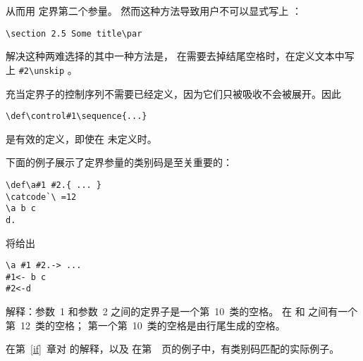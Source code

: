 \documentclass{book}
\begin{document}
从而用  定界第二个参量。
然而这种方法导致用户不可以显式写上 ：
\begin{verbatim}
\section 2.5 Some title\par
\end{verbatim}
解决这种两难选择的其中一种方法是，
在需要去掉结尾空格时，在定义文本中写上 \verb>#2\unskip> 。

充当定界子的控制序列不需要已经定义，因为它们只被吸收不会被展开。因此
\begin{verbatim}
\def\control#1\sequence{...}
\end{verbatim}
是有效的定义，即使在  未定义时。

下面的例子展示了定界参量的类别码是至关重要的：
\begin{verbatim}
\def\a#1 #2.{ ... }
\catcode`\ =12
\a b c
d.
\end{verbatim}
将给出
\begin{verbatim}
\a #1 #2.-> ...
#1<- b c
#2<-d
\end{verbatim}
解释：参数~1 和参数~2 之间的定界子是一个第~10~类的空格。
在  和  之间有一个第~12~类的空格；
第一个第~10~类的空格是由行尾生成的空格。

在第~\ref{if}~章对  的解释，以及
在第~\pageref{ex:jobnumber}~页的例子中，有类别码匹配的实际例子。
\end{document}
